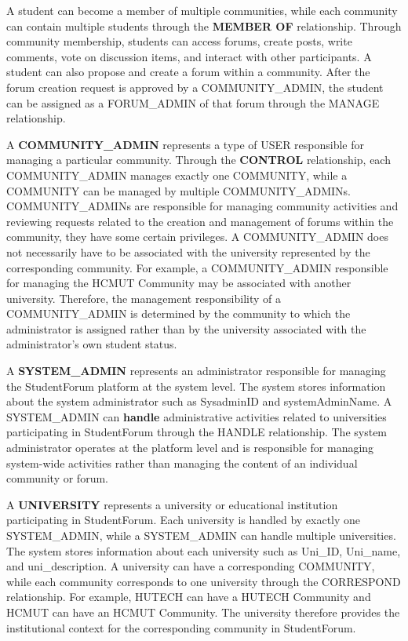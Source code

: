 A student can become a member of multiple communities, while each community can contain multiple students through the \textbf{MEMBER OF }relationship. Through community membership, students can access forums, create posts, write comments, vote on discussion items, and interact with other participants. A student can also propose and create a forum within a community. After the forum creation request is approved by a COMMUNITY\_ADMIN, the student can be assigned as a FORUM\_ADMIN of that forum through the MANAGE relationship.

A \textbf{COMMUNITY\_ADMIN} represents a type of USER responsible for managing a particular community. Through the \textbf{CONTROL }relationship, each COMMUNITY\_ADMIN manages exactly one COMMUNITY, while a COMMUNITY can be managed by multiple COMMUNITY\_ADMINs. COMMUNITY\_ADMINs are responsible for managing community activities and reviewing requests related to the creation and management of forums within the community, they have some certain privileges. A COMMUNITY\_ADMIN does not necessarily have to be associated with the university represented by the corresponding community. For example, a COMMUNITY\_ADMIN responsible for managing the HCMUT Community may be associated with another university. Therefore, the management responsibility of a COMMUNITY\_ADMIN is determined by the community to which the administrator is assigned rather than by the university associated with the administrator's own student status.

A \textbf{SYSTEM\_ADMIN} represents an administrator responsible for managing the StudentForum platform at the system level. The system stores information about the system administrator such as SysadminID and systemAdminName. A SYSTEM\_ADMIN can \textbf{handle} administrative activities related to universities participating in StudentForum through the HANDLE relationship. The system administrator operates at the platform level and is responsible for managing system-wide activities rather than managing the content of an individual community or forum. 

A \textbf{UNIVERSITY} represents a university or educational institution participating in StudentForum. Each university is handled by exactly one SYSTEM\_ADMIN, while a SYSTEM\_ADMIN can handle multiple universities. The system stores information about each university such as Uni\_ID, Uni\_name, and uni\_description. A university can have a corresponding COMMUNITY, while each community corresponds to one university through the CORRESPOND relationship. For example, HUTECH can have a HUTECH Community and HCMUT can have an HCMUT Community. The university therefore provides the institutional context for the corresponding community in StudentForum.

